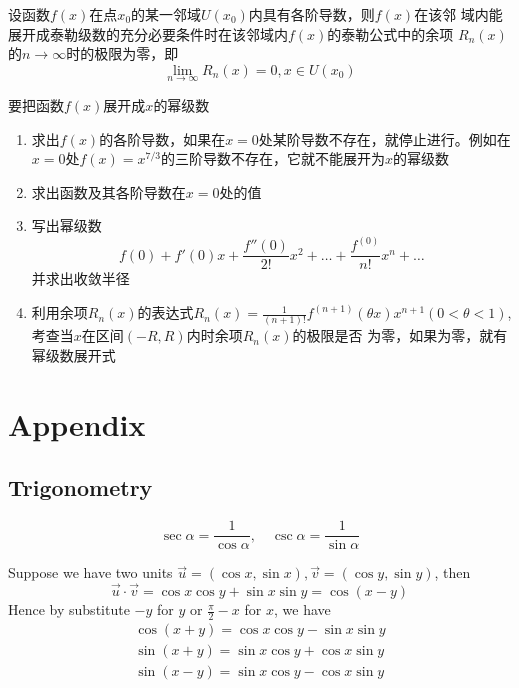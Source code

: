 \documentclass[11pt]{article}
\begin{document}
\begin{theorem}[]
设函数\(f(x)\)在点\(x_0\)的某一邻域\(U(x_0)\)内具有各阶导数，则\(f(x)\)在该邻
域内能展开成泰勒级数的充分必要条件时在该邻域内\(f(x)\)的泰勒公式中的余项
\(R_n(x)\)的\(n\to\infty\)时的极限为零，即
\begin{equation*}
\lim_{n\to\infty}R_n(x)=0,x\in U(x_0)
\end{equation*}
\end{theorem}

要把函数\(f(x)\)展开成\(x\)的幂级数
\begin{enumerate}
\item 求出\(f(x)\)的各阶导数，如果在\(x=0\)处某阶导数不存在，就停止进行。例如在
\(x=0\)处\(f(x)=x^{7/3}\)的三阶导数不存在，它就不能展开为\(x\)的幂级数
\item 求出函数及其各阶导数在\(x=0\)处的值
\item 写出幂级数
\begin{equation*}
f(0)+f'(0)x+\frac{f''(0)}{2!}x^2+\dots+\frac{f^{(0)}}{n!}x^n+\dots
\end{equation*}
并求出收敛半径
\item 利用余项\(R_n(x)\)的表达式\(R_n(x)=\frac{1}{(n+1)!}f^{(n+1)}(\theta
      x)x^{n+1}(0<\theta<1)\),考查当\(x\)在区间\((-R,R)\)内时余项\(R_n(x)\)的极限是否
为零，如果为零，就有幂级数展开式
\end{enumerate}


\section{Appendix}
\label{sec:orgb94e2a2}
\subsection{Trigonometry}
\label{sec:org11745e2}
\begin{equation*}
\sec\alpha=\frac{1}{\cos\alpha},\quad\csc\alpha=\frac{1}{\sin\alpha}
\end{equation*}

Suppose we have two units \(\vec{u}=(\cos x,\sin x),\vec{v}=(\cos y,\sin
   y)\), then
\begin{equation*}
\vec{u}\cdot\vec{v}=\cos x\cos y+\sin x\sin y=\cos(x-y)
\end{equation*}
Hence by substitute \(-y\) for \(y\) or \(\frac{\pi}{2}-x\) for \(x\), we have
\begin{gather*}
\cos(x+y)=\cos x\cos y-\sin x\sin y\\
\sin(x+y)=\sin x\cos y+\cos x\sin y\\
\sin(x-y)=\sin x\cos y-\cos x\sin y
\end{gather*}
\end{document}
